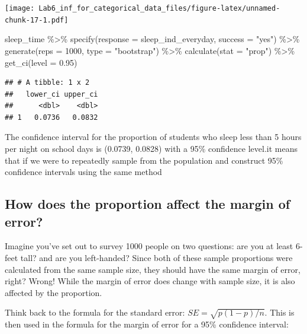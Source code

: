 \documentclass[
]{article}
\newenvironment{Shaded}{\begin{snugshade}}{\end{snugshade}}
\newcommand{\AttributeTok}[1]{\textcolor[rgb]{0.77,0.63,0.00}{#1}}
\newcommand{\DecValTok}[1]{\textcolor[rgb]{0.00,0.00,0.81}{#1}}
\newcommand{\FloatTok}[1]{\textcolor[rgb]{0.00,0.00,0.81}{#1}}
\newcommand{\FunctionTok}[1]{\textcolor[rgb]{0.00,0.00,0.00}{#1}}
\newcommand{\NormalTok}[1]{#1}
\newcommand{\SpecialCharTok}[1]{\textcolor[rgb]{0.00,0.00,0.00}{#1}}
\newcommand{\StringTok}[1]{\textcolor[rgb]{0.31,0.60,0.02}{#1}}
\begin{document}
\texttt{[image: Lab6\_inf\_for\_categorical\_data\_files/figure-latex/unnamed-chunk-17-1.pdf]}

\begin{Shaded}
\begin{Highlighting}[]
\NormalTok{sleep\_time }\SpecialCharTok{\%\textgreater{}\%}
 \FunctionTok{specify}\NormalTok{(}\AttributeTok{response =}\NormalTok{ sleep\_ind\_everyday, }\AttributeTok{success =} \StringTok{"yes"}\NormalTok{) }\SpecialCharTok{\%\textgreater{}\%}
 \FunctionTok{generate}\NormalTok{(}\AttributeTok{reps =} \DecValTok{1000}\NormalTok{, }\AttributeTok{type =} \StringTok{"bootstrap"}\NormalTok{) }\SpecialCharTok{\%\textgreater{}\%}
 \FunctionTok{calculate}\NormalTok{(}\AttributeTok{stat =} \StringTok{"prop"}\NormalTok{) }\SpecialCharTok{\%\textgreater{}\%}
 \FunctionTok{get\_ci}\NormalTok{(}\AttributeTok{level =} \FloatTok{0.95}\NormalTok{)}
\end{Highlighting}
\end{Shaded}

\begin{verbatim}
## # A tibble: 1 x 2
##   lower_ci upper_ci
##      <dbl>    <dbl>
## 1   0.0736   0.0832
\end{verbatim}

The confidence interval for the proportion of students who sleep less
than 5 hours per night on school days is (0.0739, 0.0828) with a 95\%
confidence level.it means that if we were to repeatedly sample from the
population and construct 95\% confidence intervals using the same method

\hypertarget{how-does-the-proportion-affect-the-margin-of-error}{%
\subsection{How does the proportion affect the margin of
error?}\label{how-does-the-proportion-affect-the-margin-of-error}}

Imagine you've set out to survey 1000 people on two questions: are you
at least 6-feet tall? and are you left-handed? Since both of these
sample proportions were calculated from the same sample size, they
should have the same margin of error, right? Wrong! While the margin of
error does change with sample size, it is also affected by the
proportion.

Think back to the formula for the standard error:
\(SE = \sqrt{p(1-p)/n}\). This is then used in the formula for the
margin of error for a 95\% confidence interval:
\end{document}
